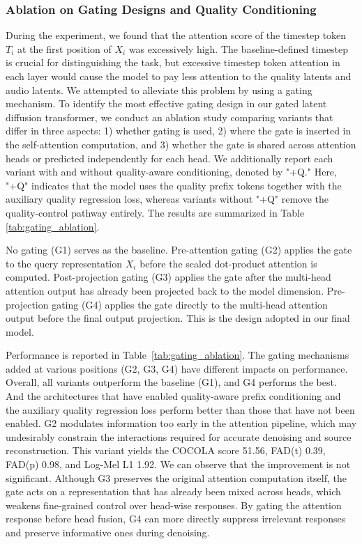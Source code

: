 \documentclass[lettersize,journal]{IEEEtran}
\begin{document}
\subsubsection{Ablation on Gating Designs and Quality Conditioning}

During the experiment, we found that the attention score of the timestep token $T_i$ at the first position of $X_i$ was excessively high. The baseline-defined timestep is crucial for distinguishing the task, but excessive timestep token attention in each layer would cause the model to pay less attention to the quality latents and audio latents. We attempted to alleviate this problem by using a gating mechanism. To identify the most effective gating design in our gated latent diffusion transformer, we conduct an ablation study comparing variants that differ in three aspects: 1) whether gating is used, 2) where the gate is inserted in the self-attention computation, and 3) whether the gate is shared across attention heads or predicted independently for each head. We additionally report each variant with and without quality-aware conditioning, denoted by "+Q." Here, "+Q" indicates that the model uses the quality prefix tokens together with the auxiliary quality regression loss, whereas variants without "+Q" remove the quality-control pathway entirely. The results are summarized in Table \ref{tab:gating_ablation}.

No gating (G1) serves as the baseline. Pre-attention gating (G2) applies the gate to the query representation $X_i$ before the scaled dot-product attention is computed. Post-projection gating (G3) applies the gate after the multi-head attention output has already been projected back to the model dimension. Pre-projection gating (G4) applies the gate directly to the multi-head attention output before the final output projection. This is the design adopted in our final model.

Performance is reported in Table~\ref{tab:gating_ablation}. The gating mechanisms added at various positions (G2, G3, G4) have different impacts on performance. Overall, all variants outperform the baseline (G1), and G4 performs the best. And the architectures that have enabled quality-aware prefix conditioning and the auxiliary
quality regression loss perform better than those that have not been enabled. G2 modulates information too early in the attention pipeline, which may undesirably constrain the interactions required for accurate denoising and source reconstruction. This variant yields the COCOLA score 51.56, FAD(t) 0.39, FAD(p) 0.98, and Log-Mel L1 1.92. We can observe that the improvement is not significant. Although G3 preserves the original attention computation itself, the gate acts on a representation that has already been mixed across heads, which weakens fine-grained control over head-wise responses. By gating the attention response before head fusion, G4 can more directly suppress irrelevant responses and preserve informative ones during denoising.
\end{document}
